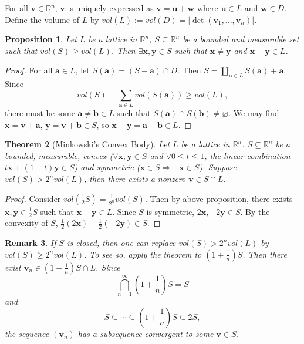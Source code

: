 \documentclass[11pt]{book}
\newtheorem{theorem}{Theorem}[section]
\newtheorem{proposition}[theorem]{Proposition}
\newtheorem{remark}[theorem]{Remark}
\begin{document}
For all $\mathbf{v}\in \mathbb{R}^{n}$, $\mathbf{v}$ is uniquely expressed as $\mathbf{v}=\mathbf{u}+\mathbf{w}$ where $\mathbf{u}\in L$ and $\mathbf{w}\in D$. Define the volume of $L$ by $vol(L):=vol(D)=\left| \det(\mathbf{v}_{1},\dots,\mathbf{v}_{n})\right|$. 



\begin{proposition}
    Let $L$ be a lattice in $\mathbb{R}^{n}$, $S\subseteq \mathbb{R}^{n}$ be a bounded and measurable set such that $vol(S)\geq vol(L)$. Then $\exists \mathbf{x}, \mathbf{y}\in S$ such that $\mathbf{x}\neq \mathbf{y}$ and $\mathbf{x}-\mathbf{y}\in L$. 
\end{proposition}

\begin{proof}
    For all $\mathbf{a}\in L$, let $S(\mathbf{a})=(S-\mathbf{a})\cap D$. Then $S=\coprod\limits_{\mathbf{a}\in L}S(\mathbf{a})+\mathbf{a}$. Since 
    \[
    vol(S)=\sum_{\mathbf{a}\in L}vol(S(\mathbf{a}))\geq vol(L),
    \]
    there must be some $\mathbf{a}\neq \mathbf{b}\in L$ such that $S(\mathbf{a})\cap S(\mathbf{b})\neq \varnothing$. We may find $\mathbf{x}=\mathbf{v}+\mathbf{a}$, $\mathbf{y}=\mathbf{v}+\mathbf{b}\in S$, so $\mathbf{x}-\mathbf{y}=\mathbf{a}-\mathbf{b}\in L$. 
\end{proof}

\begin{theorem}[Minkowski's Convex Body]\label{thm-convexBody}
    Let $L$ be a lattice in $\mathbb{R}^{n}$. $S\subseteq \mathbb{R}^{n}$ be a bounded, measurable, convex ($\forall \mathbf{x},\mathbf{y}\in S$ and $\forall 0\leq t\leq 1$, the linear combination $t\mathbf{x}+(1-t)\mathbf{y}\in S$) and symmetric ($\mathbf{x}\in S\Rightarrow -\mathbf{x}\in S$). Suppose $vol(S)>2^{n}vol(L)$, then there exists a nonzero $\mathbf{v}\in S\cap L$. 
\end{theorem}

\begin{proof}
    Consider $vol(\frac{1}{2}S)=\frac{1}{2^{n}}vol(S)$. Then by above proposition, there exists $\mathbf{x},\mathbf{y}\in \frac{1}{2}S$ such that $\mathbf{x}-\mathbf{y}\in L$. Since $S$ is symmetric, $2\mathbf{x},-2\mathbf{y}\in S$. By the convexity of $S$, $\frac{1}{2}(2\mathbf{x})+\frac{1}{2}(-2\mathbf{y})\in S$. 
\end{proof}

\begin{remark}
    If $S$ is closed, then one can replace $vol(S)>2^{n}vol(L)$ by $vol(S)\geq 2^{n}vol(L)$. To see so, apply the theorem to $(1+\frac{1}{n})S$. Then there exist $\mathbf{v}_{n}\in (1+\frac{1}{n})S\cap L$. Since 
    \[
    \bigcap_{n=1}^{\infty}(1+\frac{1}{n})S=S
    \] 
    and 
    \[
    S\subseteq \cdots\subseteq (1+\frac{1}{n})S\subseteq 2S, 
    \]
    the sequence $(\mathbf{v}_{n})$ has a subsequence convergent to some $\mathbf{v}\in S$. 
\end{remark}
\end{document}
